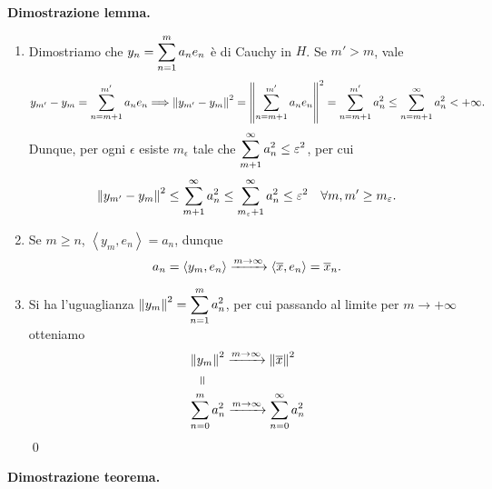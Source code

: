 \textbf{Dimostrazione lemma.} 
\begin{enumerate}
\item Dimostriamo che $\displaystyle y_n = \sum_{n = 1}^{m} a_n e_n$ è di Cauchy in $H$.
Se $m' > m$, vale
%
$$
y_{m'} - y_m = \sum_{n = m+1}^{m'} a_n e_n
\Longrightarrow  \left\lVert y_{m'} - y_m \right\rVert^2 = \left\lVert \sum_{n = m+1}^{m'} a_n e_n \right\rVert^2 
= \sum_{n = m+1}^{m'} a_n^2 \leq \sum_{n = m+1}^{\infty} a_n^2 < +\infty.
$$
%
Dunque, per ogni $\epsilon$ esiste $m_\epsilon$ tale che $\displaystyle \sum_{m + 1}^{\infty} a_n^2 \leq \varepsilon^2 $, per cui 
%
$$
\left\lVert y_{m'} - y_m \right\rVert^2 \leq \sum_{m+1}^{\infty} a_n^2 \leq \sum_{m_\varepsilon + 1}^{\infty} a_n^2 \leq \varepsilon^2 \quad \forall m,m' \geq m_\varepsilon.
$$
%

\item Se $m \geq n$, $\left<y_m, e_n \right> = a_n$, dunque
%
$$
a_n = \left<y_m, e_n \right> \xrightarrow{m \to \infty} \left<\overline{x},e_n \right> = \overline{x}_n.
$$
%

\item Si ha l'uguaglianza $\displaystyle \left\lVert y_m \right\rVert^2 = \sum_{n=1}^{m} a_n^2$, per cui passando al limite per $m \to +\infty$ otteniamo 
\begin{align*}
& \norm{y_m}^2 \xrightarrow{m \to \infty} \norm{\ol{x}}^2 \\
& \quad \rotatebox[origin=c]{90}{=} \\
& \sum_{n=0}^{m} a_n^2 \xrightarrow{m \to \infty} \sum_{n=0}^{\infty} a_n^2 
\end{align*}
\qed

\end{enumerate}


\textbf{Dimostrazione teorema.}

